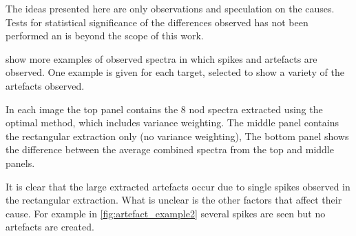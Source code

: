 The ideas presented here are only observations and speculation on the causes.
Tests for statistical significance of the differences observed has not been performed an is beyond the scope of this work.

 show more examples of observed spectra in which spikes and artefacts are observed.
One example is given for each target, selected to show a variety of the artefacts observed.

In each image the top panel contains the 8 nod spectra extracted using the optimal method, which includes variance weighting.
The middle panel contains the rectangular extraction only (no variance weighting), The bottom panel shows the difference between the average combined spectra from the top and middle panels.

It is clear that the large extracted artefacts occur due to single spikes observed in the rectangular extraction.
What is unclear is the other factors that affect their cause.
For example in \cref{fig:artefact_example2} several spikes are seen but no artefacts are created.
